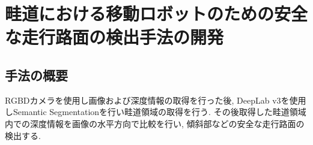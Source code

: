 \chapter{畦道における移動ロボットのための安全な走行路面の検出手法の開発}\label{chap:method}



\section{手法の概要}
RGBDカメラを使用し画像および深度情報の取得を行った後, 
DeepLab v3を使用しSemantic Segmentationを行い畦道領域の取得を行う. 
その後取得した畦道領域内での深度情報を画像の水平方向で比較を行い, 傾斜部などの安全な走行路面の検出する. 






